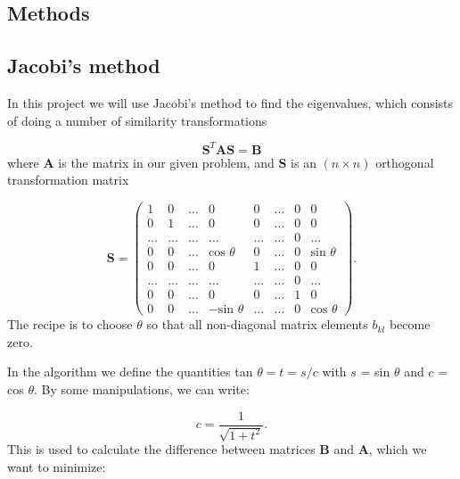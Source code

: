\documentclass{article}
\begin{document}
\begin{multicols}{2}
\section{Methods}
\subsection{Jacobi's method}
In this project we will use Jacobi's method to find the eigenvalues, which consists of doing a number of similarity transformations

\begin{equation*}
	\textbf{S}^T \textbf{AS} = \textbf{B}
\end{equation*}
where \textbf{A} is the matrix in our given problem, and \textbf{S} is an $(n \times n)$ orthogonal transformation matrix

\begin{equation*}
	\textbf{S} = \left( \begin{array}{cccccccc} 
				1 		& 0 		& \dots    		& 0    					& 0  		&\dots      	& 0 		& 0 \\
                                	0 		& 1 		& \dots  		& 0    					& 0  		&\dots     	& 0		& 0 \\
                                	\dots  	& \dots 	& \dots 		& \dots  					&\dots      	&\dots 	& 0		& \dots \\
                                	0   		& 0 		& \dots 		& \textrm{cos } \theta 		&0       	& \dots	& 0		& \textrm{sin } \theta \\
				0 		& 0 		& \dots  		& 0    					& 1  		&\dots     	& 0		& 0 \\
				\dots 	& \dots 	& \dots  		& \dots    					& \dots  	&\dots     	& 0		& \dots \\
				0 		& 0 		& \dots  		& 0    					& 0  		&\dots     	& 1		& 0 \\
				0 		& 0 		& \dots  		& - \textrm{sin } \theta  		& \dots  	&\dots     	& 0		& \textrm{cos } \theta


             \end{array} \right).
\end{equation*} 
The recipe is to choose $\theta$ so that all non-diagonal matrix elements $b_{kl}$ become zero. 

In the algorithm we define the quantities tan $\theta = t = s/c$ with $s$ = sin $\theta$ and $c$ = cos $\theta$. By some manipulations, we can write:

\begin{equation}\label{eq:cos}
	c = \frac{1}{\sqrt{1+t^2}}.
\end{equation}
This is used to calculate the difference between matrices \textbf{B} and \textbf{A}, which we want to minimize:


\end{multicols}
\end{document}
